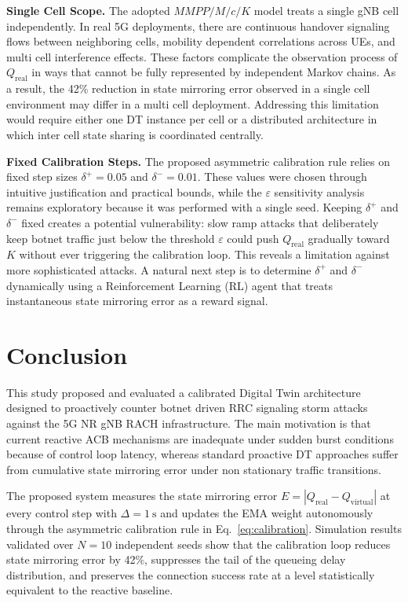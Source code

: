 \documentclass[conference]{IEEEtran}
\newcommand{\qreal}{Q_{\mathrm{real}}}
\newcommand{\qvirt}{Q_{\mathrm{virtual}}}
\begin{document}
\textbf{Single Cell Scope.} The adopted $MMPP/M/c/K$ model treats a single gNB cell independently. In real 5G deployments, there are continuous handover signaling flows between neighboring cells, mobility dependent correlations across UEs, and multi cell interference effects. These factors complicate the observation process of $\qreal$ in ways that cannot be fully represented by independent Markov chains. As a result, the 42\% reduction in state mirroring error observed in a single cell environment may differ in a multi cell deployment. Addressing this limitation would require either one DT instance per cell or a distributed architecture in which inter cell state sharing is coordinated centrally.

\textbf{Fixed Calibration Steps.} The proposed asymmetric calibration rule relies on fixed step sizes $\delta^{+} = 0.05$ and $\delta^{-} = 0.01$. These values were chosen through intuitive justification and practical bounds, while the $\varepsilon$ sensitivity analysis remains exploratory because it was performed with a single seed. Keeping $\delta^{+}$ and $\delta^{-}$ fixed creates a potential vulnerability: slow ramp attacks that deliberately keep botnet traffic just below the threshold $\varepsilon$ could push $\qreal$ gradually toward $K$ without ever triggering the calibration loop. This reveals a limitation against more sophisticated attacks. A natural next step is to determine $\delta^{+}$ and $\delta^{-}$ dynamically using a Reinforcement Learning (RL) agent that treats instantaneous state mirroring error as a reward signal.

\section{Conclusion}

This study proposed and evaluated a calibrated Digital Twin architecture designed to proactively counter botnet driven RRC signaling storm attacks against the 5G NR gNB RACH infrastructure. The main motivation is that current reactive ACB mechanisms are inadequate under sudden burst conditions because of control loop latency, whereas standard proactive DT approaches suffer from cumulative state mirroring error under non stationary traffic transitions.

The proposed system measures the state mirroring error $E = |\qreal - \qvirt|$ at every control step with $\Delta = 1\ \mathrm{s}$ and updates the EMA weight autonomously through the asymmetric calibration rule in Eq.~\eqref{eq:calibration}. Simulation results validated over $N=10$ independent seeds show that the calibration loop reduces state mirroring error by 42\%, suppresses the tail of the queueing delay distribution, and preserves the connection success rate at a level statistically equivalent to the reactive baseline.
\end{document}
